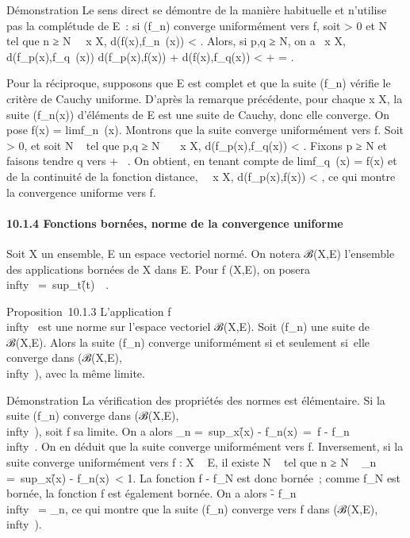\documentclass[]{article}
\begin{document}
Démonstration Le sens direct se démontre de la manière habituelle et
n'utilise pas la complétude de E~: si (f_n) converge
uniformément vers f, soit \epsilon > 0 et N \in {}~ tel que n ≥ N
\rigtharrow~\forall~x \in X, d(f(x),f_n~(x)) <
\epsilon {} . Alors, si p,q ≥ N, on a
\forall~x \in X, d(f_p(x),f_q~(x)) \leq
d(f_p(x),f(x)) + d(f(x),f_q(x)) < \epsilon
{} + \epsilon {} = \epsilon.

Pour la réciproque, supposons que E est complet et que la suite
(f_n) vérifie le critère de Cauchy uniforme. D'après la
remarque précédente, pour chaque x \in X, la suite (f_n(x))
d'éléments de E est une suite de Cauchy, donc elle converge. On pose
f(x) = limf_n~(x). Montrons que la
suite converge uniformément vers f. Soit \epsilon > 0, et soit N \in
{}~ tel que p,q ≥ N \rigtharrow~\forall~~x \in X,
d(f_p(x),f_q(x)) < \epsilon {} . Fixons p ≥ N et faisons tendre q vers + \infty~. On obtient, en tenant
compte de limf_q~(x) = f(x) et de la
continuité de la fonction distance, \forall~~x \in X,
d(f_p(x),f(x)) \leq \epsilon {} < \epsilon, ce
qui montre la convergence uniforme vers f.

\paragraph{10.1.4 Fonctions bornées, norme de la convergence uniforme}

Soit X un ensemble, E un espace vectoriel normé. On notera ℬ(X,E)
l'ensemble des applications bornées de X dans E. Pour f (X,E), on
posera \f\\infty~
=\
sup_t\inX\f(t)\
\in {}~.

Proposition~10.1.3 L'application
f\mapsto~\f\\infty~
est une norme sur l'espace vectoriel ℬ(X,E). Soit (f_n) une
suite de ℬ(X,E). Alors la suite (f_n) converge uniformément si
et seulement si~elle converge dans (ℬ(X,E),\
\\infty~), avec la même limite.

Démonstration La vérification des propriétés des normes est élémentaire.
Si la suite (f_n) converge dans
(ℬ(X,E),\ \\infty~), soit f
sa limite. On a alors \mu_n =\
sup_x\inX\f(x) -
f_n(x)\ =\ f
- f_n\\infty~. On en déduit que la suite
converge uniformément vers f. Inversement, si la suite converge
uniformément vers f : X \rightarrow~ E, il existe N \in {}~ tel que n ≥ N \rigtharrow~
\mu_n =\
sup_x\inX\f(x) -
f_n(x)\ < 1. La fonction f -
f_N est donc bornée~; comme f_N est bornée, la
fonction f est également bornée. On a alors \f
- f_n\\infty~ = \mu_n, ce qui montre
que la suite (f_n) converge vers f dans
(ℬ(X,E),\ \\infty~).
\end{document}
